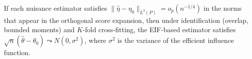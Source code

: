 


\begin{corollary}
\label{cor:dml}
If each nuisance estimator satisfies $\|\hat\eta - \eta_0\|_{L^2(P)} = o_p(n^{-1/4})$ in the norms that appear in the orthogonal score expansion, then under identification (overlap, bounded moments) and $K$-fold cross-fitting, the EIF-based estimator satisfies $\sqrt{n}(\hat\theta - \theta_0) \leadsto N(0, \sigma^2)$, where $\sigma^2$ is the variance of the efficient influence function.
\end{corollary}

